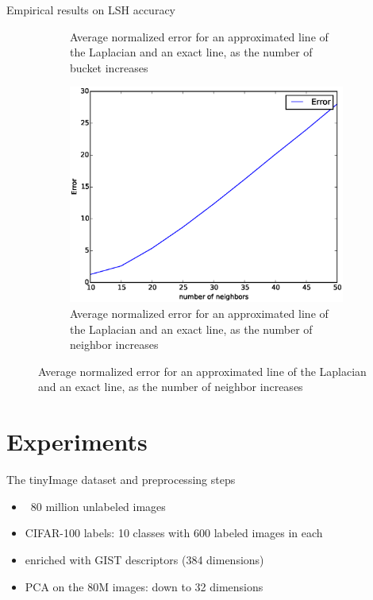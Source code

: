 \documentclass[11pt)]{beamer}
\begin{document}
\begin{frame}{Empirical results on LSH accuracy}
\begin{itemize}
\begin{figure}[!h]
\begin{subfigure}{0.27\textwidth}
   \caption{Average normalized error for an approximated line of the Laplacian and an exact line, as the number of bucket increases}
 \end{subfigure}\hfill
 \centering
 \begin{subfigure}{0.27\textwidth}
   \includegraphics[width=\textwidth]{error_k.eps}
   \caption{Average normalized error for an approximated line of the Laplacian and an exact line, as the number of neighbor increases}
 \end{subfigure}

\end{figure}
\end{itemize}

\end{frame}

\section{Experiments}
\begin{frame}{The tinyImage dataset and preprocessing steps}
\begin{itemize}
\item ~80 million unlabeled images
\item CIFAR-100 labels: 10 classes with 600 labeled images in each
\item enriched with GIST descriptors (384 dimensions)
\item PCA on the 80M images: down to 32 dimensions
\end{itemize}
\end{frame}
\end{document}
